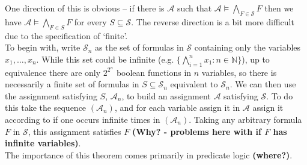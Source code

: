 \documentclass{tikzposter} %
\newtheorem{definition}{Definition}
\begin{document}
\begin{columns}
{{    One direction of this is obvious -- if there is $\mathcal{A}$ such that $\mathcal{A} \vDash \bigwedge_{F \in \mathcal{S}} F$ then we have $\mathcal{A} \vDash \bigwedge_{F \in S} F$ for every $S \subseteq \mathcal{S}$. The reverse direction is a bit more difficult due to the specification of `finite'. \\

    To begin with, write $\mathcal{S}_{n}$ as the set of formulas in $\mathcal{S}$ containing only the variables $x_{1},\dots,x_{n}$. While this set could be infinite (e.g. $\{\bigwedge_{i=1}^{n} x_{1} : n \in \mathbb{N}\}$), up to equivalence there are only $2^{2^{n}}$ boolean functions in $n$ variables, so there is necessarily a finite set of formulas in $S \subseteq \mathcal{S}_{n}$ equivalent to $\mathcal{S}_{n}$. We can then use the assignment satisfying $S$, $\mathcal{A}_{n}$, to build an assignment $\mathcal{A}$ satisfying $\mathcal{S}$. To do this take the sequence $(\mathcal{A}_{n})$, and for each variable assign it in $\mathcal{A}$ assign it according to if one occurs infinite times in $(\mathcal{A}_{n})$. Taking any arbitrary formula $F$ in $\mathcal{S}$, this assignment satisfies $F$ \textbf{(Why? - problems here with if $F$ has infinite variables)}. \\

    The importance of this theorem comes primarily in predicate logic \textbf{(where?)}.
  }
  }

\end{columns}
\end{document}
